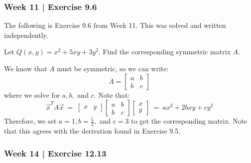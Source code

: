 \newpage
\subsubsection{Week 11 | Exercise 9.6}

The following is Exercise 9.6 from Week 11. This was solved and written
independently.

\begin{exr}[num=9.6]
    Let $ Q(x, y) = x^{2} + 5xy + 3y^{2} $. Find the corresponding symmetric
    matrix $ A $.
\end{exr}

\begin{pf}
    We know that $ A $ must be symmetric, so we can write:
    \begin{equation*}
        A = \begin{bmatrix}
            a & b \\ b & c
        \end{bmatrix}
    \end{equation*}
    where we solve for $ a, b, $ and $ c $.
    Note that:
    \begin{equation*}
        \vec{x}^{T}A\vec{x} \ = \
        \begin{bmatrix}
            x & y
        \end{bmatrix}
        \begin{bmatrix}
            a & b \\ b & c
        \end{bmatrix}
        \begin{bmatrix}
            x \\ y
        \end{bmatrix} \ = \
        ax^{2} + 2bxy + cy^{2}
    \end{equation*}
    Therefore, we set $ a = 1, b = \frac{5}{2}, $ and $ c = 3 $ to get the
    corresponding matrix. Note that this agrees with the derivation found in
    Exercise 9.5.
\end{pf}
\newpage
\subsubsection{Week 14 | Exercise 12.13}

